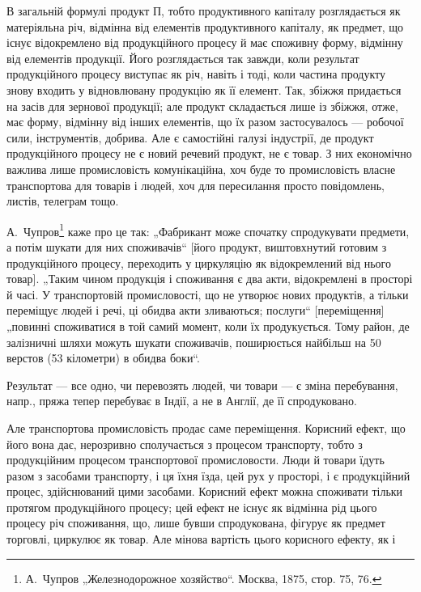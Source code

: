 В загальній формулі продукт $П$, тобто продуктивного капіталу розглядається
як матеріяльна річ, відмінна від елементів продуктивного капіталу, як
предмет, що існує відокремлено від продукційного процесу й має споживну
форму, відмінну від елементів продукції. Його розглядається так завжди, коли
результат продукційного процесу виступає як річ, навіть і тоді, коли частина
продукту знову входить у відновлювану продукцію як її елемент. Так,
збіжжя придається на засів для зернової продукції; але продукт складається
лише із збіжжя, отже, має форму, відмінну від інших елементів, що
їх разом застосувалось — робочої сили, інструментів, добрива. Але є
самостійні галузі індустрії, де продукт продукційного процесу не є
новий речевий продукт, не є товар. З них економічно важлива лише
промисловість комунікаційна, хоч буде то промисловість власне транспортова
для товарів і людей, хоч для пересилання просто повідомлень,
листів, телеграм тощо.

А.~Чупров\footnote{
А.~Чупров „Железнодорожное хозяйство“. Москва, 1875, стор. 75, 76.
} каже про це так: „Фабрикант може спочатку спродукувати
предмети, а потім шукати для них споживачів“ [його продукт, виштовхнутий
готовим з продукційного процесу, переходить у циркуляцію як
відокремлений від нього товар]. „Таким чином продукція і споживання є
два акти, відокремлені в просторі й часі. У транспортовій промисловості,
що не утворює нових продуктів, а тільки переміщує людей і речі, ці
обидва акти зливаються; послуги“ [переміщення] „повинні споживатися в
той самий момент, коли їх продукується. Тому район, де залізничні шляхи
можуть шукати споживачів, поширюється найбільш на 50 верстов
(53 кілометри) в обидва боки“.

Результат — все одно, чи перевозять людей, чи товари — є зміна перебування,
напр., пряжа тепер перебуває в Індії, а не в Англії, де її спродуковано.

Але транспортова промисловість продає саме переміщення. Корисний
ефект, що його вона дає, нерозривно сполучається з процесом транспорту,
тобто з продукційним процесом транспортової промисловости.
Люди й товари їдуть разом з засобами транспорту, і ця їхня їзда, цей
рух у просторі, і є продукційний процес, здійснюваний цими засобами. Корисний
ефект можна споживати тільки протягом продукційного процесу;
цей ефект не існує як відмінна рід цього процесу річ споживання,
що, лише бувши спродукована, фігурує як предмет торговлі,
циркулює як товар. Але мінова вартість цього корисного ефекту, як і
\parbreak{}  %

